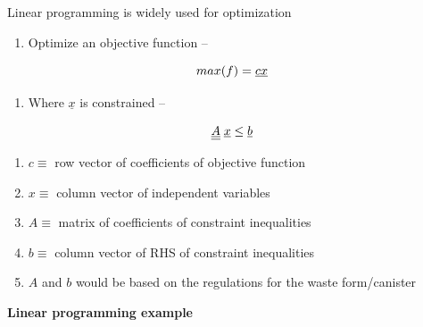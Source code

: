 \documentclass[aspectratio=1610,pdftex,dvipsnames,compress,xcolor={dvipsnames}]{beamer}
\begin{document}
\begin{frame}{Linear programming is widely used for optimization}
    \begin{enumerate}[series=outerlist,topsep=0pt,itemsep=1pt,leftmargin=*,label=(\arabic*)]
        \item[]Optimize an objective function --
    \end{enumerate}

    \vspace*{\fill}

    \begin{equation}
        \LARGE
        max(f) = \underline{c} \underline{x}
    \end{equation}

    \vspace*{\fill}

    \begin{enumerate}[series=outerlist,topsep=0pt,itemsep=1pt,leftmargin=*,label=(\arabic*)]
        \item[]Where $\underline{x}$ is constrained --
    \end{enumerate}

    \vspace*{\fill}

    \begin{equation}
        \LARGE
        \underline{\underline{A}} \; \underline{x} \leq \underline{b}
    \end{equation}

    \vspace*{\fill}

    \begin{enumerate}[series=outerlist,topsep=0pt,itemsep=5pt,leftmargin=*,label=(\arabic*)]
        \item[]$c \equiv$ row vector of coefficients of objective function
        \item[]$x \equiv$ column vector of independent variables
        \item[]$A \equiv$ matrix of coefficients of constraint inequalities
        \item[]$b \equiv$ column vector of RHS of constraint inequalities
        \item[]$A$ and $b$ would be based on the regulations for the waste form/canister
    \end{enumerate}
\end{frame}


\begin{frame}[plain]{}
    \centering\Large\textbf{Linear programming example}
\end{frame}
\end{document}
